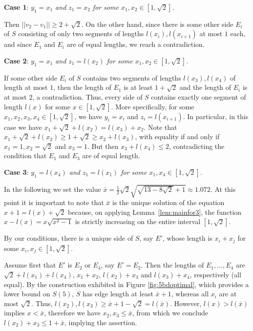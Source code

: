 \documentclass[twoside]{amsart}
\begin{document}
\smallskip

\textbf{Case 1}:
\emph{$y_1=x_1$ and $z_1=x_2$ for some $x_1, x_2 \in [1,\sqrt{2}]$.}

Then $||v_2-v_1|| \geq 2+\sqrt{2}$. On the other hand, since there is some other side $E_i$ of $S$ consisting of only two segments of lengths $l(x_i), l(x_{i+1})$ at most $1$ each, and since $E_1$ and $E_i$ are of equal lengths, we reach a contradiction.

\smallskip

\textbf{Case 2}:
\emph{$y_1=x_1$ and $z_1=l(x_2)$ for some $x_1,x_2 \in [1,\sqrt{2}]$.}

If some other side $E_i$ of $S$ contains two segments of lengths $l(x_3),l(x_4)$ of length at most $1$, then the length of $E_1$ is at least $1+\sqrt{2}$ and the length of $E_i$ is at most $2$, a contradiction. Thus, every side of $S$ contains exactly one segment of length $l(x)$ for some $x \in [1,\sqrt{2}]$. More specifically, for some $x_1,x_2,x_3,x_4 \in [1,\sqrt{2}]$, we have $y_i=x_i$ and $z_i=l(x_{i+1})$. In particular, in this case we have $x_1 + \sqrt{2}+l(x_2)=l(x_3) + x_2$. Note that $x_1+\sqrt{2}+l(x_2) \geq 1+\sqrt{2} \geq x_2 + l(x_3)$, with equality if and only if $x_1=1, x_2=\sqrt{2}$ and $x_3=1$. But then $x_3 +l(x_4) \leq 2$, contradicting the condition that $E_1$ and $E_3$ are of equal length.

\smallskip

\textbf{Case 3}:
\emph{$y_1=l(x_4)$ and $z_1=l(x_1)$ for some $x_1,x_4 \in [1,\sqrt{2}]$.}

In the following we set the value $\bar{x}= \frac{1}{2}\sqrt{2}\sqrt{\sqrt{13-8\sqrt{2}}+1}\approx1.072$.
At this point it is important to note that $\bar{x}$ is the unique solution of the equation $x+1=l(x)+\sqrt{2}$ because, on applying Lemma~\ref{lem:mainfor3},
the function $x-l(x) = x\sqrt{x^2-1}$ is strictly increasing on the entire interval $[1,\sqrt{2}]$.

By our conditions, there is a unique side of $S$, say $E'$, whose length is $x_i+x_j$ for some $x_i,x_j \in [1,\sqrt{2}]$. 


Assume first that $E'$ is $E_2$ or $E_4$, say $E'=E_2$. Then the lengths of $E_1, \ldots, E_4$ are $\sqrt{2}+l(x_1)+l(x_4)$, $x_1+x_2$, $l(x_2)+x_3$ and $l(x_3)+x_4$, respectively (all equal). By the construction exhibited in Figure \ref{fig:5bdoptimal}, which provides a lower bound on $S(5)$, $S$ has edge length at least $\bar{x}+1$, whereas all $x_i$ are at most $\sqrt{2}$. Thus, $l(x_2),l(x_3) \geq \bar{x}+1-\sqrt{2} = l(\bar{x})$. 
However, $l(x) > l(\bar{x})$ implies $x < \bar{x}$, therefore we have
$x_2, x_3 \leq \bar{x}$, from which we conclude $l(x_2)+x_3 \leq 1+\bar{x}$, implying the assertion.
\end{document}
